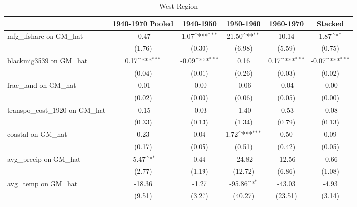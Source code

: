 \begin{table}[htbp]\centering
\def\sym#1{\ifmmode^{#1}\else\(^{#1}\)\fi}
\caption{West Region}
\begin{tabular}{l*{5}{c}}
\toprule
                &\multicolumn{1}{c}{1940-1970 Pooled}&\multicolumn{1}{c}{1940-1950}&\multicolumn{1}{c}{1950-1960}&\multicolumn{1}{c}{1960-1970}&\multicolumn{1}{c}{Stacked}\\
\midrule
mfg\_lfshare on GM\_hat&    -0.47         &     1.07\sym{***}&    21.50\sym{**} &    10.14         &     1.87\sym{*}  \\
                &   (1.76)         &   (0.30)         &   (6.98)         &   (5.59)         &   (0.75)         \\
\addlinespace
blackmig3539 on GM\_hat&     0.17\sym{***}&    -0.09\sym{***}&     0.16         &     0.17\sym{***}&    -0.07\sym{***}\\
                &   (0.04)         &   (0.01)         &   (0.26)         &   (0.03)         &   (0.02)         \\
\addlinespace
frac\_land on GM\_hat&    -0.01         &    -0.00         &    -0.06         &    -0.04         &    -0.00         \\
                &   (0.02)         &   (0.00)         &   (0.06)         &   (0.05)         &   (0.00)         \\
\addlinespace
transpo\_cost\_1920 on GM\_hat&    -0.15         &    -0.03         &    -1.40         &    -0.53         &    -0.08         \\
                &   (0.33)         &   (0.13)         &   (1.34)         &   (0.79)         &   (0.13)         \\
\addlinespace
coastal on GM\_hat&     0.23         &     0.04         &     1.72\sym{***}&     0.50         &     0.09         \\
                &   (0.17)         &   (0.05)         &   (0.51)         &   (0.42)         &   (0.05)         \\
\addlinespace
avg\_precip on GM\_hat&    -5.47\sym{*}  &     0.44         &   -24.82         &   -12.56         &    -0.66         \\
                &   (2.77)         &   (1.19)         &  (12.72)         &   (6.86)         &   (1.08)         \\
\addlinespace
avg\_temp on GM\_hat&   -18.36         &    -1.27         &   -95.86\sym{*}  &   -43.03         &    -4.93         \\
                &   (9.51)         &   (3.27)         &  (40.27)         &  (23.51)         &   (3.14)         \\

\end{tabular}
\end{table}
